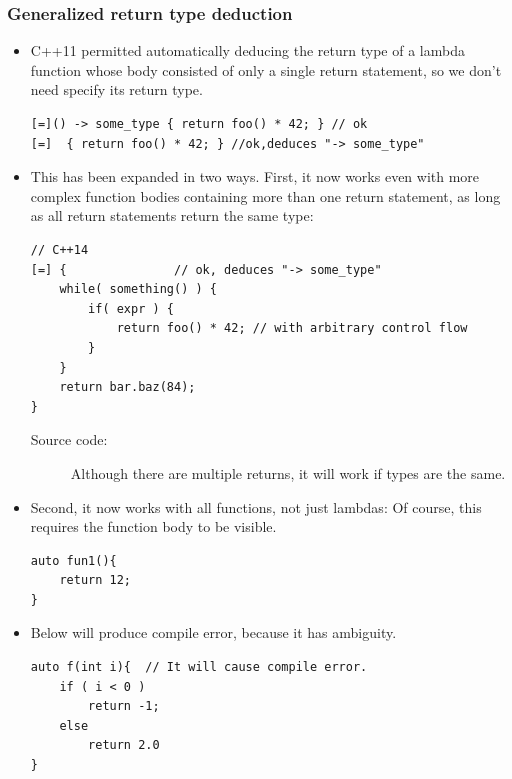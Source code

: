 \documentclass[a4paper,11pt,twoside]{book}
\begin{document}
\subsubsection{Generalized return type deduction}
\begin{itemize}
	\item C++11 permitted automatically deducing the return type of a lambda function whose body consisted of only a single return statement, so we don't need specify its return type.
\begin{lstlisting}[numbers=none]
[=]() -> some_type { return foo() * 42; } // ok
[=]  { return foo() * 42; } //ok,deduces "-> some_type"
\end{lstlisting}

\item This has been expanded in two ways. First, it now works even with more complex function bodies containing more than one return statement, as long as all return statements return the same type:
\begin{lstlisting}
// C++14
[=] {               // ok, deduces "-> some_type"
	while( something() ) {
		if( expr ) {
			return foo() * 42; // with arbitrary control flow
		}
	}
	return bar.baz(84); 
}                       
\end{lstlisting}
\begin{description}
	\item[Source code:] Although there are multiple returns, it will work if types are the same.
\end{description}

\item Second, it now works with all functions, not just lambdas: Of course, this requires the function body to be visible.
\begin{lstlisting}[numbers=none]
auto fun1(){
	return 12;
}
\end{lstlisting}

	\item Below will produce compile error, because it has ambiguity.
\begin{lstlisting}[numbers=none]
auto f(int i){  // It will cause compile error.
	if ( i < 0 )
		return -1;
	else
		return 2.0
}
\end{lstlisting}

\end{itemize}
\end{document}
